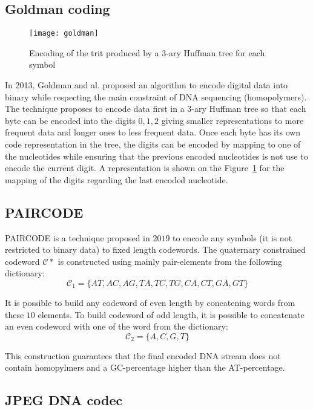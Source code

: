
\subsection{Goldman coding}
\begin{figure}
    \centering
    \texttt{[image: goldman]}
    \caption{Encoding of the trit produced by a 3-ary Huffman tree for each symbol}
    \label{fig:goldman}
\end{figure}

In 2013, Goldman and al. \cite{bib:goldman} proposed an algorithm to encode digital data into binary while respecting the main constraint of DNA sequencing (homopolymers). 
The technique proposes to encode data first in a 3-ary Huffman tree so that each byte can be encoded into the digits $0,1,2$ giving smaller representations to more frequent data and longer ones to less frequent data. 
Once each byte has its own code representation in the tree, the digits can be encoded by mapping to one of the nucleotides while ensuring that the previous encoded nucleotides is not use to encode the current digit. A representation is shown on the Figure~\ref{fig:goldman} for the mapping of the digits regarding the last encoded nucleotide.

\subsection{PAIRCODE}

PAIRCODE \cite{bib:paircode} is a technique proposed \cite{bib:paircode} in $2019$ to encode any symbols (it is not restricted to binary data) to fixed length codewords.
The quaternary constrained codeword $\mathcal{C}*$ is constructed using mainly pair-elements from the following dictionary:
$$
\mathcal{C}_1=\{AT,AC,AG,TA,TC,TG,CA,CT,GA,GT\}
$$

It is possible to build any codeword of even length by concatening words from these $10$ elements. To build codeword of odd length, it is possible to concatenate an even codeword with one of the word from the dictionary:
$$
\mathcal{C}_2=\{A,C,G,T\}
$$

This construction guarantees that the final encoded DNA stream does not contain homopylmers and a GC-percentage higher than the AT-percentage.

\subsection{JPEG DNA codec}
\label{subsec:jpegdna}

